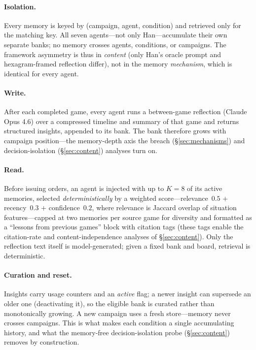 \documentclass[11pt]{article}
\begin{document}
\paragraph{Isolation.} Every memory is keyed by (campaign, agent, condition) and retrieved only for the matching key. All seven agents---not only Han---accumulate their own separate banks; no memory crosses agents, conditions, or campaigns. The framework asymmetry is thus in \emph{content} (only Han's oracle prompt and hexagram-framed reflection differ), not in the memory \emph{mechanism}, which is identical for every agent.

\paragraph{Write.} After each completed game, every agent runs a between-game reflection (Claude Opus 4.6) over a compressed timeline and summary of that game and returns structured insights, appended to its bank. The bank therefore grows with campaign position---the memory-depth axis the breach (\S\ref{sec:mechanisms}) and decision-isolation (\S\ref{sec:content}) analyses turn on.

\paragraph{Read.} Before issuing orders, an agent is injected with up to $K=8$ of its active memories, selected \emph{deterministically} by a weighted score---relevance~$0.5$ $+$ recency~$0.3$ $+$ confidence~$0.2$, where relevance is Jaccard overlap of situation features---capped at two memories per source game for diversity and formatted as a ``lessons from previous games'' block with citation tags (these tags enable the citation-rate and content-independence analyses of \S\ref{sec:content}). Only the reflection text itself is model-generated; given a fixed bank and board, retrieval is deterministic.

\paragraph{Curation and reset.} Insights carry usage counters and an \emph{active} flag; a newer insight can supersede an older one (deactivating it), so the eligible bank is curated rather than monotonically growing. A new campaign uses a fresh store---memory never crosses campaigns. This is what makes each condition a single accumulating history, and what the memory-free decision-isolation probe (\S\ref{sec:content}) removes by construction.
\end{document}
